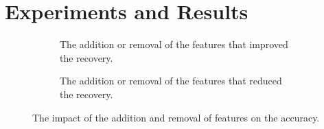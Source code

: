 \section{Experiments and Results}
\label{sec:results}


\begin{figure}
    \begin{subfigure}{\textwidth} %
        \centering
        \caption{The addition or removal of the features that improved the recovery.}
        \label{fig:subfig1}
    \end{subfigure}%
    
    \begin{subfigure}{0.9\textwidth}
        \centering
        \caption{The addition or removal of the features that reduced the recovery.}
        \label{fig:subfig2}
    \end{subfigure}
    \caption{\label{fig:impactoffeatureadditionandremoval} The impact of the addition and removal of features on the accuracy. }
\end{figure}

